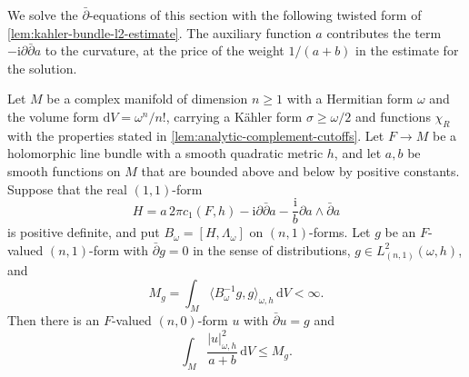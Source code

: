 We solve the $\bar\partial$-equations of this section with the following twisted form of \cref{lem:kahler-bundle-l2-estimate}. The auxiliary function $a$ contributes the term $-\mathrm i\partial\bar\partial a$ to the curvature, at the price of the weight $1/(a+b)$ in the estimate for the solution.

\begin{lemma}\label{lem:twisted-kahler-line-estimate}
Let $M$ be a complex manifold of dimension $n\geq1$ with a Hermitian form $\omega$ and the volume form $\mathrm dV=\omega^n/n!$, carrying a K\"ahler form $\sigma\geq\omega/2$ and functions $\chi_R$ with the properties stated in \cref{lem:analytic-complement-cutoffs}. Let $F\to M$ be a holomorphic line bundle with a smooth quadratic metric $h$, and let $a,b$ be smooth functions on $M$ that are bounded above and below by positive constants. Suppose that the real $(1,1)$-form
\[
 H=a\,2\pi c_1(F,h)-\mathrm i\partial\bar\partial a
             -\frac{\mathrm i}{b}\partial a\wedge\bar\partial a
\]
is positive definite, and put $B_\omega=[H,\Lambda_\omega]$ on $(n,1)$-forms. Let $g$ be an $F$-valued $(n,1)$-form with $\bar\partial g=0$ in the sense of distributions, $g\in L^2_{(n,1)}(\omega,h)$, and
\[
 M_g=\int_M\langle B_\omega^{-1}g,g\rangle_{\omega,h}\,\mathrm dV<\infty.
\]
Then there is an $F$-valued $(n,0)$-form $u$ with $\bar\partial u=g$ and
\begin{equation}\label{eq:twisted-kahler-correction}
 \int_M\frac{|u|_{\omega,h}^2}{a+b}\,\mathrm dV\leq M_g.
\end{equation}
\end{lemma}
